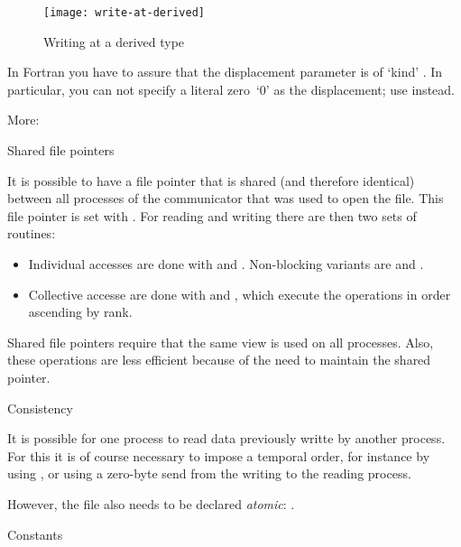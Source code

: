 \begin{figure}[ht]
  \label{fig:write-derived}
  \caption{Writing at a derived type}
  \texttt{[image: write-at-derived]}
\end{figure}

\begin{fortrannote}
  In Fortran you have to assure that the displacement parameter is of
  `kind' . In particular, you can not
  specify a literal zero~`0' as the displacement; use
   instead.
\end{fortrannote}

More:

 {Shared file pointers}

It is possible to have a file pointer that is shared (and therefore identical)
between all processes of the communicator that was used to open the file.
This file pointer is set with .
For reading and writing there are then two sets of routines:
\begin{itemize}
\item Individual accesses are done with 
  and .
  Non-blocking variants are 
  and .
\item Collective accesse are done with 
  and , which execute the operations
  in order ascending by rank.
\end{itemize}

Shared file pointers require that the same view is used on all processes.
Also, these operations are less efficient because of the need to maintain the
shared pointer.

 {Consistency}

It is possible for one process to read data previously writte by another process.
For this it is of course necessary to impose a temporal order,
for instance by using ,
or using a zero-byte send from the writing to the reading process.

However, the file also needs to be declared
\emph{atomic}:
.

 {Constants}

